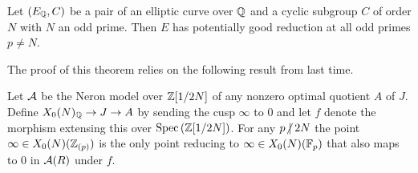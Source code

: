 \documentclass[12pt]{article}
\begin{document}
\begin{theorem}
Let $(E_{\mathbb{Q}}, C)$ be a pair of an elliptic curve over $\mathbb{Q}$ and a cyclic subgroup $C$ of order $N$ with $N$ an odd prime. Then $E$ has potentially good reduction at all odd primes $p \neq N$. 
\end{theorem}

The proof of this theorem relies on the following result from last time.

\begin{prop}
Let $\mathcal{A}$ be the Neron model over $\mathbb{Z}[1/2N]$ of any nonzero optimal quotient $A$ of $J$. Define $X_0(N)_{\mathbb{Q}} \to J \to A$ by sending the cusp $\infty$ to $0$ and let $f$ denote the morphism extensing this over $\mathrm{Spec}\left( \mathbb{Z}[1/2N] \right)$. For any $p \ndivides 2 N$ the point $\infty \in X_0(N)(\mathbb{Z}_{(p)})$ is the only point reducing to $\infty \in X_0(N)(\mathbb{F}_p)$ that also maps to $0$ in $\mathcal{A}(R)$ under $f$.
\end{prop}
\end{document}
